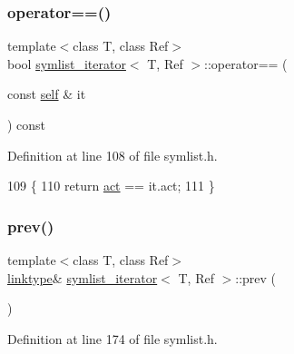 \subsubsection{\texorpdfstring{operator==()}{operator==()}}
{\footnotesize\ttfamily template$<$class T, class Ref$>$ \\
bool \mbox{\hyperlink{structsymlist__iterator}{symlist\+\_\+iterator}}$<$ T, Ref $>$\+::operator== (\begin{DoxyParamCaption}\item[{const \mbox{\hyperlink{structsymlist__iterator_ae1426e0085d4c88445c0a84675ee7d38}{self}} \&}]{it }\end{DoxyParamCaption}) const\hspace{0.3cm}{\ttfamily [inline]}}



Definition at line 108 of file symlist.\+h.


\begin{DoxyCode}
109     \{
110     \textcolor{keywordflow}{return} \mbox{\hyperlink{structsymlist__iterator_a1c7a0193ab85baa7705070975d841fc8}{act}} == it.act;
111     \}
\end{DoxyCode}
\mbox{\label{structsymlist__iterator_a30f1c0a962713ded0c24871093089fb0}} 
\subsubsection{\texorpdfstring{prev()}{prev()}}
{\footnotesize\ttfamily template$<$class T, class Ref$>$ \\
\mbox{\hyperlink{structsymlist__iterator_ad9462ba519f8ca01ea64e04e25ee3750}{linktype}}\& \mbox{\hyperlink{structsymlist__iterator}{symlist\+\_\+iterator}}$<$ T, Ref $>$\+::prev (\begin{DoxyParamCaption}{ }\end{DoxyParamCaption})\hspace{0.3cm}{\ttfamily [inline]}}



Definition at line 174 of file symlist.\+h.


